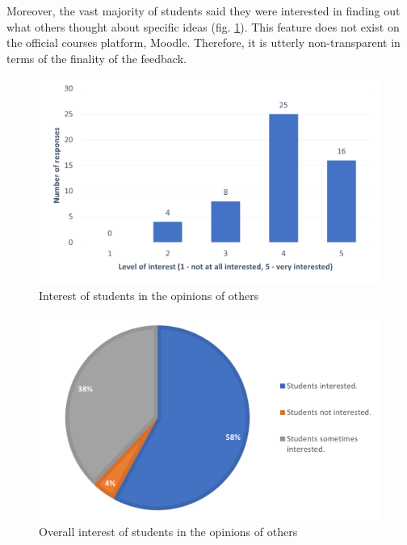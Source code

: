     Moreover, the vast majority of students said they were interested in finding out what others thought about specific ideas (fig. \ref{3:fig:feedback_interest_barchart}). This feature does not exist on the official courses platform, Moodle. Therefore, it is utterly non-transparent in terms of the finality of the feedback.
    
    \begin{figure}[ht]
        \centering
             \includegraphics[height=0.24\textheight]{figures/charts/survey/feedback_interest_barchart.png}
        \caption{Interest of students in the opinions of others}
        \label{3:fig:feedback_interest_barchart}
    \end{figure}
    
    \clearpage
    
    \begin{figure}[ht]
        \centering
             \includegraphics[height=0.22\textheight]{figures/charts/survey/overall_interest.png}
        \caption{Overall interest of students in the opinions of others}
        \label{3:fig:overall_interest}
    \end{figure}
    
